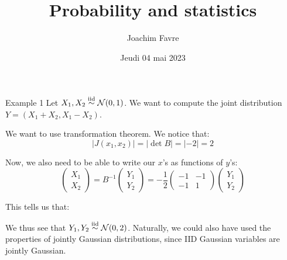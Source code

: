 \documentclass[a4paper]{article}
\title{Probability and statistics}
\author{Joachim Favre}
\date{Jeudi 04 mai 2023}
\begin{document}
\maketitle


\begin{parag}{Example 1}
    Let $X_1, X_2 \iid \mathcal{N}\left(0, 1\right)$. We want to compute the joint distribution $Y = \left(X_1 + X_2, X_1 - X_2\right)$.

    We want to use transformation theorem. We notice that: 
    \[\left|J\left(x_1, x_2\right)\right| = \left|\det B\right| = \left|-2\right| = 2\]

    Now, we also need to be able to write our $x$'s as functions of $y$'s: 
    \[\begin{pmatrix} X_1 \\ X_2 \end{pmatrix} = B^{-1} \begin{pmatrix} Y_1 \\ Y_2 \end{pmatrix} = -\frac{1}{2} \begin{pmatrix} -1 & -1 \\ -1 & 1 \end{pmatrix} \begin{pmatrix} Y_1 \\ Y_2 \end{pmatrix} \]
    
    This tells us that: 
    
    We thus see that $Y_1, Y_2 \iid \mathcal{N}\left(0, 2\right)$. Naturally, we could  also have used the properties of jointly Gaussian distributions, since IID Gaussian variables are jointly Gaussian.
\end{parag}
\end{document}

